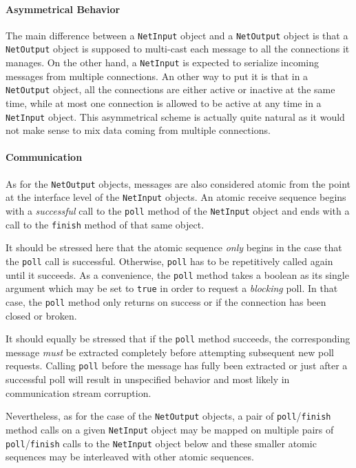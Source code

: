 \documentclass[11pt]{book}
\begin{document}
\paragraph{Asymmetrical Behavior}
\label{sec:asymm-behav}

The main difference between a \texttt{NetInput} object and a
\texttt{NetOutput} object is that a \texttt{NetOutput} object is
supposed to multi-cast each message to all the connections it manages.
On the other hand, a \texttt{NetInput} is expected to serialize
incoming messages from multiple connections. An other way to put it is
that in a \texttt{NetOutput} object, all the connections are either
active or inactive at the same time, while at most one connection is
allowed to be active at any time in a \texttt{NetInput} object.
This asymmetrical scheme is actually quite natural as it would not
make sense to mix data coming from multiple connections.


\paragraph{Communication}
\label{sec:communication-2}

As for the \texttt{NetOutput} objects, messages are also considered
atomic from the point at the interface level of the \texttt{NetInput}
objects. An atomic receive sequence begins with a \emph{successful}
call to the \texttt{poll} method of the \texttt{NetInput} object and
ends with a call to the \texttt{finish} method of that same object.

It should be stressed here that the atomic sequence \emph{only} begins
in the case that the \texttt{poll} call is successful. Otherwise,
\texttt{poll} has to be repetitively called again until it succeeds.
As a convenience, the \texttt{poll} method takes a boolean as its
single argument which may be set to \texttt{true} in order to request
a \emph{blocking} poll. In that case, the \texttt{poll} method only
returns on success or if the connection has been closed or broken.

It should equally be stressed that if the \texttt{poll} method
succeeds, the corresponding message \emph{must} be extracted
completely before attempting subsequent new poll requests. Calling
\texttt{poll} before the message has fully been extracted or just
after a successful poll will result in unspecified behavior and most
likely in communication stream corruption.

Nevertheless, as for the case of the \texttt{NetOutput} objects, a
pair of \texttt{poll}/\texttt{finish} method calls on a given
\texttt{NetInput} object may be mapped on multiple pairs of
\texttt{poll}/\texttt{finish} calls to the \texttt{NetInput} object
below and these smaller atomic sequences may be interleaved with other
atomic sequences.
\end{document}
